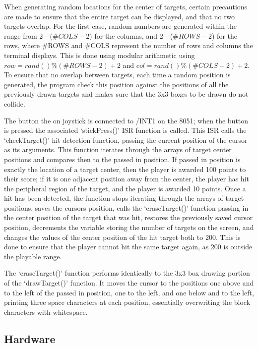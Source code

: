 \documentclass[12pt]{article}
\begin{document}
When generating random locations for the center of targets, certain precautions are made to ensure that the entire target can be displayed, and that no two targets overlap. For the first case, random numbers are generated within the range from 2---($\#COLS-2$) for the columns, and 2---($\#ROWS-2$) for the rows, where \#ROWS and \#COLS represent the number of rows and columns the terminal displays. This is done using modular arithmetic using $row = rand()\%(\#ROWS-2)+2$ and $col = rand()\%(\#COLS-2)+2$. To ensure that no overlap between targets, each time a random position is generated, the program check this position against the positions of all the previously drawn targets and makes sure that the 3x3 boxes to be drawn do not collide. 

The button the on joystick is connected to /INT1 on the 8051; when the button is pressed the associated `stickPress()' ISR function is called. This ISR calls the `checkTarget()' hit detection function, passing the current position of the cursor as its arguments. This function iterates through the arrays of target center positions and compares then to the passed in position. If passed in position is exactly the location of a target center, then the player is awarded 100 points to their score; if it is one adjacent position away from the center, the player has hit the peripheral region of the target, and the player is awarded 10 points. Once a hit has been detected, the function stops iterating through the arrays of target positions, saves the cursors position, calls the `eraseTarget()' function passing in the center position of the target that was hit, restores the previously saved cursor position, decrements the variable storing the number of targets on the screen, and changes the values of the center position of the hit target both to 200. This is done to ensure that the player cannot hit the same target again, as 200 is outside the playable range.   

The `eraseTarget()' function performs identically to the 3x3 box drawing portion of the `drawTarget()' function. It moves the cursor to the positions one above and to the left of the passed in position, one to the left, and one below and to the left, printing three space characters at each position, essentially overwriting the block characters with whitespace.
\subsection{Hardware}
\end{document}
